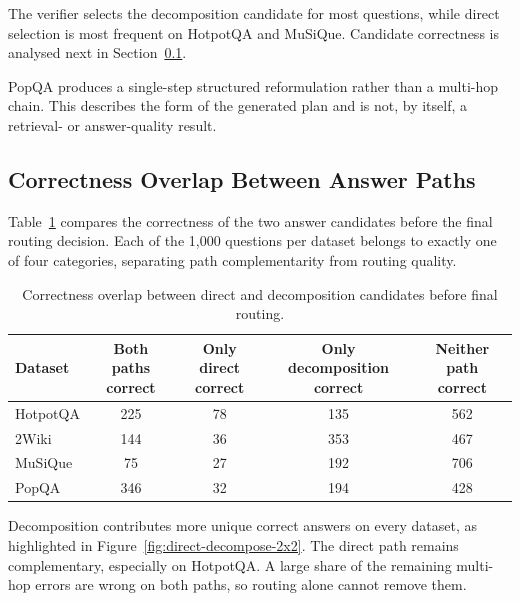 \documentclass{nthu_thesis}
\begin{document}
\begin{thesiscjk}
The verifier selects the decomposition candidate for most questions, while direct selection is most frequent on HotpotQA and MuSiQue. Candidate correctness is analysed next in Section~\ref{sec:path-distribution}.

PopQA produces a single-step structured reformulation rather than a multi-hop chain. This describes the form of the generated plan and is not, by itself, a retrieval- or answer-quality result.

\subsection{Correctness Overlap Between Answer Paths}
\label{sec:path-distribution}

Table~\ref{tab:path-distribution} compares the correctness of the two answer candidates before the final routing decision. Each of the 1{,}000 questions per dataset belongs to exactly one of four categories, separating path complementarity from routing quality.

\begin{table}[h]
    \centering
    \caption[Correctness Overlap Between the Two Answer Paths]{Correctness overlap between direct and decomposition candidates before final routing.}
    \label{tab:path-distribution}
    \setlength{\tabcolsep}{7pt}
    \small
    \begin{tabular}{ l c c c c }
        \toprule
        Dataset & \shortstack{Both paths\\correct} & \shortstack{Only direct\\correct} & \shortstack{Only decomposition\\correct} & \shortstack{Neither path\\correct} \\
        \midrule
        HotpotQA & 225 & 78 & 135 & 562 \\
        2Wiki & 144 & 36 & 353 & 467 \\
        MuSiQue & 75 & 27 & 192 & 706 \\
        PopQA & 346 & 32 & 194 & 428 \\
        \bottomrule
    \end{tabular}
\end{table}

Decomposition contributes more unique correct answers on every dataset, as highlighted in Figure~\ref{fig:direct-decompose-2x2}. The direct path remains complementary, especially on HotpotQA. A large share of the remaining multi-hop errors are wrong on both paths, so routing alone cannot remove them.


\end{thesiscjk}
\end{document}
